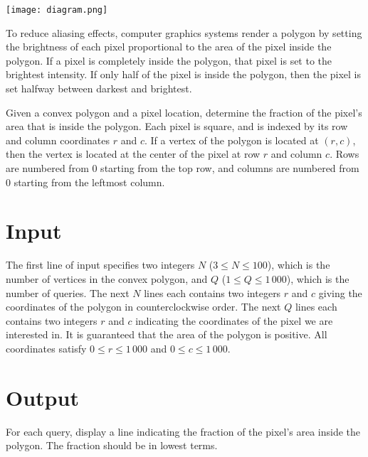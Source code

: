 
\begin{center}
\texttt{[image: diagram.png]}
\end{center}

To reduce aliasing effects, computer graphics systems render a polygon 
by setting the brightness of each pixel proportional to the area of the 
pixel inside the polygon.  If a pixel is completely inside the polygon, 
that pixel is set to the brightest intensity.  If only half of the pixel 
is inside the polygon, then the pixel is set halfway between darkest and 
brightest.

Given a convex polygon and a pixel location, determine the fraction of
the pixel's area that is inside the polygon.  Each pixel is square,
and is indexed by its row and column coordinates $r$ and $c$.  If a
vertex of the polygon is located at $(r,c)$, then the vertex is
located at the center of the pixel at row $r$ and column $c$.
Rows are numbered from $0$ starting from the top row, and columns are numbered
from $0$ starting from the leftmost column.


\section*{Input}

The first line of input specifies two integers $N$
($3 \leq N \leq 100$), which is the number of vertices in the convex
polygon, and $Q$ ($1 \leq Q \leq 1\,000$), which is the number of
queries.  The next $N$ lines each contains two integers $r$ and $c$
giving the coordinates of the polygon in
counterclockwise order.  The next $Q$ lines each contains two integers
$r$ and $c$ indicating the coordinates of
the pixel we are interested in.  It is guaranteed that the area of the
polygon is positive.  All coordinates satisfy $0 \leq r \leq 1\,000$
and $0 \leq c \leq 1\,000$.

\section*{Output}

For each query, display a line indicating the fraction of the pixel's
area inside the polygon.  The fraction should be in
lowest terms.  

